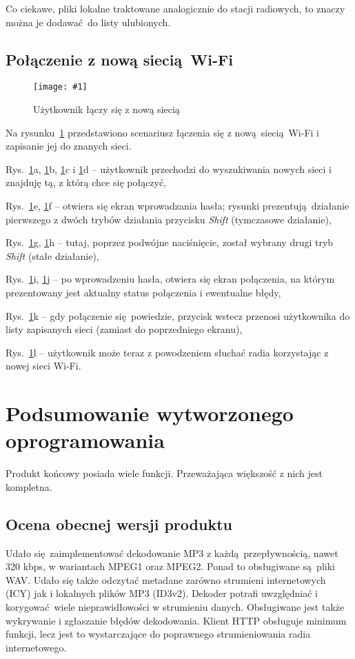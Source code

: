 \documentclass[12pt]{report}
\let\tempone\itemize
\let\temptwo\enditemize
\renewenvironment{itemize}{\tempone\setlength{\itemsep}{0cm}}{\temptwo}
\newcommand{\imgint}[4]{
	\begin{figure}[{#4}]
		\centering
		\texttt{[image: \#1]}
		\caption{#2}
		\label{#1}
	\end{figure}
}
\newcommand{\imgh}[3]{\imgint{#1}{#2}{#3}{H}}
\begin{document}
			Co ciekawe, pliki lokalne traktowane analogicznie do stacji radiowych, to znaczy można je dodawać do listy ulubionych.
			
		\subsection{Połączenie z nową siecią Wi-Fi}
			\imgh{5/PicoRadio-fl-wifi}{Użytkownik łączy się z nową siecią}{0.9}
			\newcommand{\rflwifi}[1]{\ref{5/PicoRadio-fl-wifi}#1}
			
			Na rysunku~\rflwifi{} przedstawiono scenariusz łączenia się z nową siecią Wi-Fi i zapisanie jej do znanych sieci.
			
			\begin{itemize}
				\item Rys.~\rflwifi{a}, \rflwifi{b}, \rflwifi{c} i \rflwifi{d} -- użytkownik przechodzi do wyszukiwania nowych sieci i znajduję tą, z którą chce się połączyć,
				\item Rys.~\rflwifi{e}, \rflwifi{f} -- otwiera się ekran wprowadzania hasła; rysunki prezentują działanie pierwszego z dwóch trybów działania przycisku \textit{Shift} (tymczasowe działanie),
				\item Rys.~\rflwifi{g}, \rflwifi{h} -- tutaj, poprzez podwójne naciśnięcie, został wybrany drugi tryb \textit{Shift} (stałe działanie),
				\item Rys.~\rflwifi{i}, \rflwifi{j} -- po wprowadzeniu hasła, otwiera się ekran połączenia, na którym prezentowany jest aktualny status połączenia i ewentualne błędy,
				\item Rys.~\rflwifi{k} -- gdy połączenie się powiedzie, przycisk wstecz przenosi użytkownika do listy zapisanych sieci (zamiast do poprzedniego ekranu),
				\item Rys.~\rflwifi{l} -- użytkownik może teraz z powodzeniem słuchać radia korzystając z nowej sieci Wi-Fi.
			\end{itemize}
			
	\section{Podsumowanie wytworzonego oprogramowania}
		Produkt końcowy posiada wiele funkcji. Przeważająca większość z nich jest kompletna.
		
		\subsection{Ocena obecnej wersji produktu}
			Udało się zaimplementować dekodowanie MP3 z każdą przepływnością, nawet 320 kbps, w wariantach MPEG1 oraz MPEG2. Ponad to obsługiwane są pliki WAV. Udało się także odczytać metadane zarówno strumieni internetowych (ICY) jak i lokalnych plików MP3 (ID3v2). Dekoder potrafi uwzględniać i korygować wiele nieprawidłowości w strumieniu danych. Obsługiwane jest także wykrywanie i zgłaszanie błędów dekodowania. Klient HTTP obsługuje minimum funkcji, lecz jest to wystarczające do poprawnego strumieniowania radia internetowego.
			$ $\\
			
\end{document}
